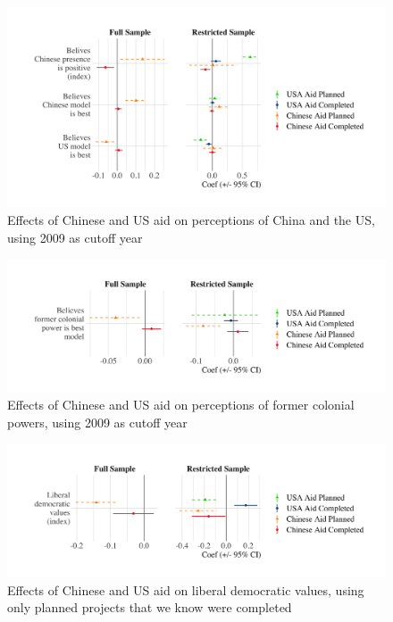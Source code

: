 \documentclass[9pt]{article}
\begin{document}
\begin{figure}[H]
\centering
\includegraphics[width=1\textwidth]{figures/figure_a6.png}
\caption{Effects of Chinese and US aid on perceptions of China and the US, using 2009 as cutoff year}
\end{figure}

\begin{figure}[H]
\centering
\includegraphics[width=1\textwidth]{figures/figure_a7.png}
\caption{Effects of Chinese and US aid on perceptions of former colonial powers, using 2009 as cutoff year}
\end{figure}

\begin{figure}[H]
\centering
\includegraphics[width=1\textwidth]{figures/figure_a8.png}
\caption{Effects of Chinese and US aid on liberal democratic values, using only planned projects that we know were completed}
\end{figure}
\end{document}
